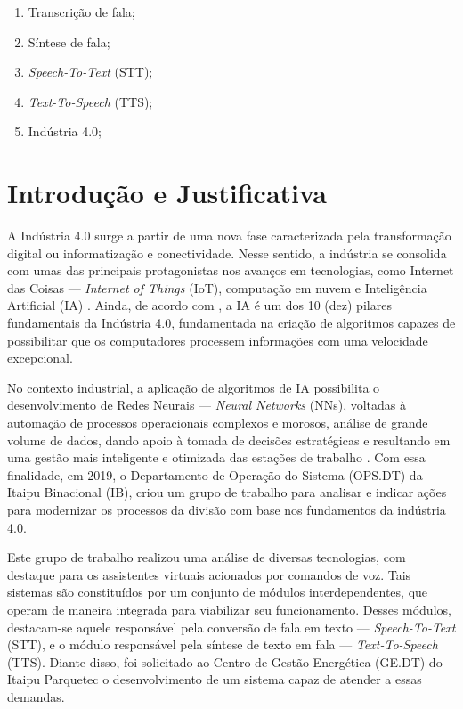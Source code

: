 \documentclass[
	12pt,				%
	a4paper,			%
	english,			%
	brazil,				%
	]{article}
\begin{document}
        \begin{enumerate}
        	\item Transcrição de fala;
        	\item Síntese de fala;
        	\item \textit{Speech-To-Text} (STT);
        	\item \textit{Text-To-Speech} (TTS);
        	\item Indústria 4.0;
        \end{enumerate}



\section{Introdução e Justificativa}

A Indústria 4.0 surge a partir de uma nova fase caracterizada pela transformação digital ou informatização e conectividade. Nesse sentido, a indústria se consolida com umas das principais protagonistas nos avanços em tecnologias, como Internet das Coisas — \textit{Internet of Things} (IoT), computação em nuvem e Inteligência Artificial (IA) \cite{basco2018}. Ainda, de acordo com , a IA é um dos 10 (dez) pilares fundamentais da Indústria 4.0, fundamentada na criação de algoritmos capazes de possibilitar que os computadores processem informações com uma velocidade excepcional.

No contexto industrial, a aplicação de algoritmos de IA possibilita o desenvolvimento de Redes Neurais — \textit{Neural Networks} (NNs), voltadas à automação de processos operacionais complexos e morosos, análise de grande volume de dados, dando apoio à tomada de decisões estratégicas e resultando em uma gestão mais inteligente e otimizada das estações de trabalho \cite{basco2018}. Com essa finalidade, em 2019, o Departamento de Operação do Sistema (OPS.DT) da Itaipu Binacional (IB), criou um grupo de trabalho para analisar e indicar ações para modernizar os processos da divisão com base nos fundamentos da indústria 4.0.

Este grupo de trabalho realizou uma análise de diversas tecnologias, com destaque para os assistentes virtuais acionados por comandos de voz. Tais sistemas são constituídos por um conjunto de módulos interdependentes, que operam de maneira integrada para viabilizar seu funcionamento. Desses módulos, destacam-se aquele responsável pela conversão de fala em texto — \textit{Speech-To-Text} (STT), e o módulo responsável pela síntese de texto em fala — \textit{Text-To-Speech} (TTS). Diante disso, foi solicitado ao Centro de Gestão Energética (GE.DT) do Itaipu Parquetec o desenvolvimento de um sistema capaz de atender a essas demandas.
\end{document}

